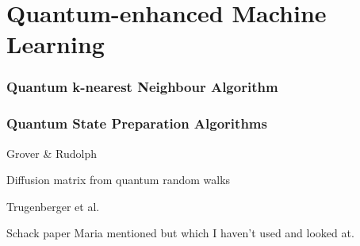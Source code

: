 \chapter{Quantum-enhanced Machine Learning}\label{sec:qml}

\subsection{Quantum k-nearest Neighbour Algorithm}
\label{subsubsec:quantumknearestneighbour}

\subsection{Quantum State Preparation Algorithms}
\label{subsubsec:quantumstatepreparation}

Grover \& Rudolph

Diffusion matrix from quantum random walks

Trugenberger et al.

Schack paper Maria mentioned but which I haven't used and looked at.